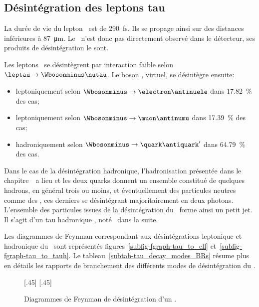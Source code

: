 \subsection{Désintégration des leptons tau}\label{chapter-MS-MSSM-section-pheno_Higgs_MSSM-subsec-desintegration_lepton_tau}
La durée de vie du lepton \tau\ est de \SI{290}{\femto\second}. Ils se propage ainsi sur des distances inférieures à \SI{87}{\micro\meter}.
Le \tau\ n'est donc pas directement observé dans le détecteur, ses produits de désintégration le sont.
\par Les leptons \tau\ se désintègrent par interaction faible selon $\leptau\to\Wbosonminus\nutau$.
Le boson \Wboson, virtuel, se désintègre ensuite:
\begin{itemize}
\item leptoniquement selon $\Wbosonminus\to\electron\antinuele$ dans \SI{17.82}{\%} des cas;
\item leptoniquement selon $\Wbosonminus\to\muon\antinumu$ dans \SI{17.39}{\%} des cas;
\item hadroniquement selon $\Wbosonminus\to\quark\antiquark'$ dans \SI{64.79}{\%} des cas.
\end{itemize}
\par Dans le cas de la désintégration hadronique, l'hadronisation présentée dans le chapitre~\ a lieu et les deux quarks donnent un ensemble constitué de quelques hadrons, en général trois ou moins, et éventuellement des particules neutres comme des \pionnull, ces derniers se désintégrant majoritairement en deux photons.
L'ensemble des particules issues de la désintégration du \Wboson\ forme ainsi un petit jet.
Il s'agit d'un \og tau hadronique \fg, noté \tauh\ dans la suite.
\par Les diagrammes de Feynman correspondant aux désintégrations leptonique et hadronique du \tau\ sont représentés figures~\ref{subfig-fgraph-tau_to_ell} et~\ref{subfig-fgraph-tau_to_tauh}.
Le tableau~\ref{subtab-tau_decay_modes_BRs} résume plus en détails les rapports de branchement des différents modes de désintégration du \tau.
\begin{figure}[h]
\centering
\vspace{\baselineskip}
[.45\textwidth]
{\vspace{\baselineskip}}
\hfill
{}[.45\textwidth]
{\vspace{\baselineskip}}
\caption{Diagrammes de Feynman de désintégration d'un \leptau.}
\label{fig-fgraph-tau_to_ell_and_tauh}
\end{figure}
